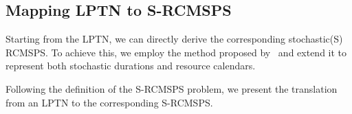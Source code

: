 \subsection{Mapping LPTN to S-RCMSPS}

Starting from the LPTN, we can directly derive the corresponding stochastic(S) RCMSPS. To achieve this, we employ the method proposed by~\cite{senderovich2019learning} and extend it to represent both stochastic durations and resource calendars.

Following the definition of the S-RCMSPS problem, we present the translation from an LPTN to the corresponding S-RCMSPS.

